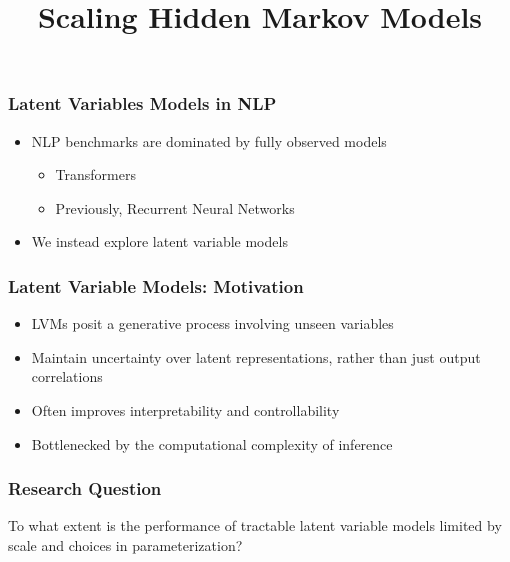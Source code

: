 \documentclass{beamer}
\title{Scaling Hidden Markov Models}
\begin{document}
\frame{\titlepage}

\begin{frame}
\frametitle{Latent Variables Models in NLP}
\begin{itemize}
\item NLP benchmarks are dominated by fully observed models
\vspace{2em}
    \begin{itemize}
    \item Transformers
    \vspace{2em}
    \item Previously, Recurrent Neural Networks
    \end{itemize}
\vspace{2em}
\item We instead explore latent variable models
\end{itemize}
\end{frame}

\begin{frame}
\frametitle{Latent Variable Models: Motivation}
\begin{itemize}
\item LVMs posit a generative process involving unseen variables
\vspace{2em}
\item Maintain uncertainty over latent representations,
    rather than just output correlations
\vspace{2em}
\item Often improves interpretability and controllability
\vspace{2em}
\item Bottlenecked by the computational complexity of inference
\end{itemize}
\end{frame}

\begin{frame}
\frametitle{Research Question}
To what extent is the performance of tractable
latent variable models limited by scale and choices in parameterization?
\end{frame}

\end{document}
